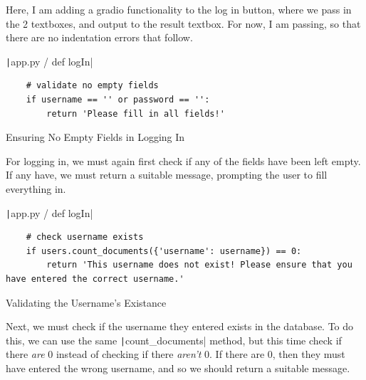 \documentclass[12pt]{report}
\newcommand{\pil}[1]{\protect\texttt|#1|}
\begin{document}
Here, I am adding a gradio functionality to the log in button, where we pass in the 2 textboxes, and output to the result textbox. For now, I am passing, so that there are no indentation errors that follow.

\begin{center}
\end{center}

\begin{listing}[H]
\pil{app.py / def logIn}
\begin{verbatim}
    # validate no empty fields
    if username == '' or password == '':
        return 'Please fill in all fields!'
\end{verbatim}
\caption{Ensuring No Empty Fields in Logging In}\label{cs:noEmptyFieldsLogIn}
\end{listing}

For logging in, we must again first check if any of the fields have been left empty. If any have, we must return a suitable message, prompting the user to fill everything in.

\begin{listing}[H]
\pil{app.py / def logIn}
\begin{verbatim}
    # check username exists
    if users.count_documents({'username': username}) == 0:
        return 'This username does not exist! Please ensure that you have entered the correct username.'
\end{verbatim}
\caption{Validating the Username's Existance}\label{cs:validateUsernameExists}
\end{listing}

Next, we must check if the username they entered exists in the database. To do this, we can use the same \pil{count_documents} method, but this time check if there \textit{are} 0 instead of checking if there \textit{aren't} 0. If there are 0, then they must have entered the wrong username, and so we should return a suitable message.
\end{document}
